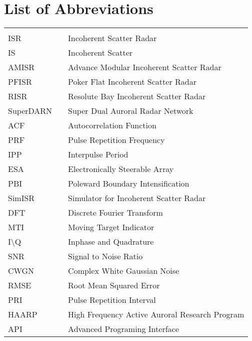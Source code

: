 \chapter*{List of Abbreviations}
\begin{center}
  \begin{tabular}{lll}
    \hspace*{2em} & \hspace*{1in} & \hspace*{4.5in} \\
    ISR  & \dotfill & Incoherent Scatter Radar \\
    IS & \dotfill & Incoherent Scatter\\
    AMISR  & \dotfill & Advance Modular Incoherent Scatter Radar \\
    PFISR & \dotfill & Poker Flat Incoherent Scatter Radar\\
    RISR & \dotfill & Resolute Bay Incoherent Scatter Radar\\
    SuperDARN & \dotfill & Super Dual Auroral Radar Network\\
    ACF & \dotfill & Autocorrelation Function\\
    PRF & \dotfill & Pulse Repetition Frequency \\
    IPP & \dotfill & Interpulse Period\\
    ESA  & \dotfill & Electronically Steerable Array \\
    PBI & \dotfill & Poleward Boundary Intensification \\
    SimISR & \dotfill & Simulator for Incoherent Scatter Radar \\
    DFT & \dotfill & Discrete Fourier Transform \\
    MTI & \dotfill & Moving Target Indicator \\
    I\textbackslash Q & \dotfill & Inphase and Quadrature\\
    SNR & \dotfill & Signal to Noise Ratio\\
    CWGN & \dotfill & Complex White Gaussian Noise\\
    RMSE & \dotfill & Root Mean Squared Error\\
    PRI & \dotfill & Pulse Repetition Interval\\
    HAARP & \dotfill & High Frequency Active Auroral Research Program\\
    API & \dotfill & Advanced Programing Interface

 
  \end{tabular}
\end{center}
\cleardoublepage


\newpage
\endofprelim
